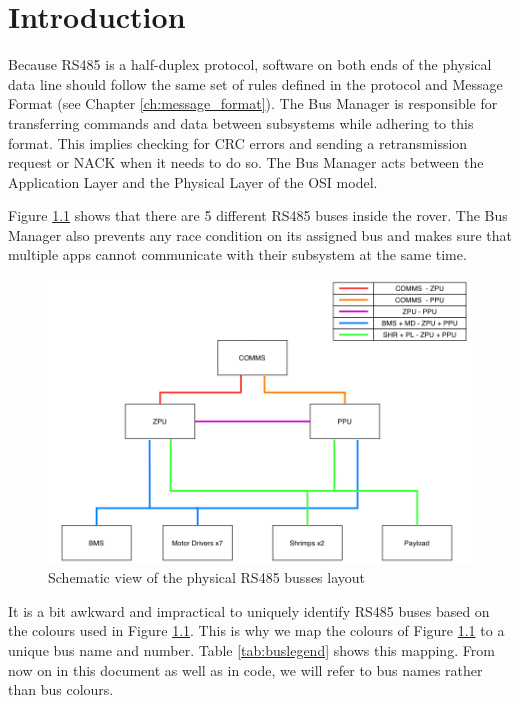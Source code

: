 \chapter{Introduction}
Because RS485 is a half-duplex protocol, software on both ends of the physical data line should follow the same set of rules defined in the protocol and Message Format (see Chapter \ref{ch:message_format}). The Bus Manager is responsible for transferring commands and data between subsystems while adhering to this format.
This implies checking for CRC errors and sending a retransmission request or NACK when it needs to do so.
The Bus Manager acts between the Application Layer and the Physical Layer of the OSI model.

Figure \ref{fig:rs485_diagram} shows that there are 5 different RS485 buses inside the rover.
The Bus Manager also prevents any race condition on its assigned bus and makes sure that multiple apps cannot communicate with their subsystem at the same time.

\begin{figure}[H]
    \centering
    \includegraphics[scale=0.4]{figures/RS485_connections.png}
    \caption{Schematic view of the physical RS485 busses layout}
    \label{fig:rs485_diagram}
\end{figure}


\newpage


It is a bit awkward and impractical to uniquely identify RS485 buses based on the colours used in Figure \ref{fig:rs485_diagram}.
This is why we map the colours of Figure \ref{fig:rs485_diagram} to a unique bus name and number.
Table \ref{tab:buslegend} shows this mapping.
From now on in this document as well as in code, we will refer to bus names rather than bus colours.

